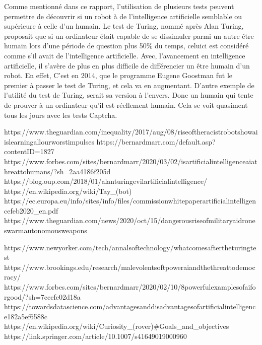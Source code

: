 \documentclass[letterpaper,10pt,french]{sphinxmanual}
\begin{document}
Comme mentionné dans ce rapport, l’utilisation de plusieurs tests peuvent permettre de découvrir si un robot à de l’intelligence artificielle semblable ou supérieure à celle d’un humain. Le test de Turing, nommé après Alan Turing, proposait que si un ordinateur était capable de se dissimuler parmi un autre être humain lors d’une période de question plus 50\% du temps, celui\sphinxhyphen{}ci est considéré comme s’il avait de l’intelligence artificielle. Avec, l’avancement en intelligence artificielle, il s’avère de plus en plus difficile de différencier un être humain d’un robot. En effet, C’est en 2014, que le programme Eugene Goostman fut le premier à passer le test de Turing, et cela va en augmentant. D’autre exemple de l’utilité du test de Turing, serait sa version à l’envers. Donc un humain qui tente de prouver à un ordinateur qu’il est réellement humain. Cela se voit quasiment tous les jours avec les tests Captcha.

https://www.theguardian.com/inequality/2017/aug/08/rise\sphinxhyphen{}of\sphinxhyphen{}the\sphinxhyphen{}racist\sphinxhyphen{}robots\sphinxhyphen{}how\sphinxhyphen{}ai\sphinxhyphen{}is\sphinxhyphen{}learning\sphinxhyphen{}all\sphinxhyphen{}our\sphinxhyphen{}worst\sphinxhyphen{}impulses
https://bernardmarr.com/default.asp?contentID=1827
https://www.forbes.com/sites/bernardmarr/2020/03/02/is\sphinxhyphen{}artificial\sphinxhyphen{}intelligence\sphinxhyphen{}ai\sphinxhyphen{}a\sphinxhyphen{}threat\sphinxhyphen{}to\sphinxhyphen{}humans/?sh=2aa4186f205d
https://blog.oup.com/2018/01/alan\sphinxhyphen{}turing\sphinxhyphen{}evil\sphinxhyphen{}artificial\sphinxhyphen{}intelligence/
https://en.wikipedia.org/wiki/Tay\_(bot)
https://ec.europa.eu/info/sites/info/files/commission\sphinxhyphen{}white\sphinxhyphen{}paper\sphinxhyphen{}artificial\sphinxhyphen{}intelligence\sphinxhyphen{}feb2020\_en.pdf
https://www.theguardian.com/news/2020/oct/15/dangerous\sphinxhyphen{}rise\sphinxhyphen{}of\sphinxhyphen{}military\sphinxhyphen{}ai\sphinxhyphen{}drone\sphinxhyphen{}swarm\sphinxhyphen{}autonomous\sphinxhyphen{}weapons

https://www.newyorker.com/tech/annals\sphinxhyphen{}of\sphinxhyphen{}technology/what\sphinxhyphen{}comes\sphinxhyphen{}after\sphinxhyphen{}the\sphinxhyphen{}turing\sphinxhyphen{}test
https://www.brookings.edu/research/malevolent\sphinxhyphen{}soft\sphinxhyphen{}power\sphinxhyphen{}ai\sphinxhyphen{}and\sphinxhyphen{}the\sphinxhyphen{}threat\sphinxhyphen{}to\sphinxhyphen{}democracy/
https://www.forbes.com/sites/bernardmarr/2020/02/10/8\sphinxhyphen{}powerful\sphinxhyphen{}examples\sphinxhyphen{}of\sphinxhyphen{}ai\sphinxhyphen{}for\sphinxhyphen{}good/?sh=7cccfe02d18a
https://towardsdatascience.com/advantages\sphinxhyphen{}and\sphinxhyphen{}disadvantages\sphinxhyphen{}of\sphinxhyphen{}artificial\sphinxhyphen{}intelligence\sphinxhyphen{}182a5ef6588c
https://en.wikipedia.org/wiki/Curiosity\_(rover)\#Goals\_and\_objectives
https://link.springer.com/article/10.1007/s41649\sphinxhyphen{}019\sphinxhyphen{}00096\sphinxhyphen{}0
\end{document}
